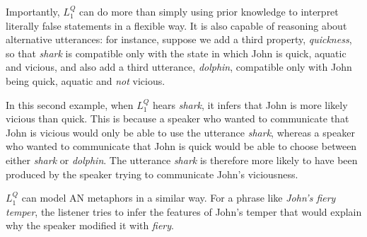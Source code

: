 \documentclass[9pt,twocolumn,twoside,lineno]{pnas-new}
\newcommand{\Listener}{L}
\newcommand{\QLONE}{\Listener_{{1}}^{{Q}}}
\begin{document}
	Importantly, $\QLONE$ can do more than simply using prior knowledge to interpret literally false statements in a flexible way. It is also capable of reasoning about alternative utterances: for instance, suppose we add a third property, \emph{quickness}, so that \emph{shark} is compatible only with the state in which John is quick, aquatic and vicious, and also add a third utterance, \emph{dolphin}, compatible only with John being quick, aquatic and \emph{not} vicious.

	
	In this second example, when $\QLONE$ hears \emph{shark}, it infers that John is more likely vicious than quick. This is because a speaker who wanted to communicate that John is vicious would only be able to use the utterance \emph{shark}, whereas a speaker who wanted to communicate that John is quick would be able to choose between either \emph{shark} or \emph{dolphin}. The utterance \emph{shark} is therefore more likely to have been produced by the speaker trying to communicate John's viciousness.

	



	$\QLONE$ can model AN metaphors in a similar way. For a phrase like \emph{John's fiery temper}, the listener tries to infer the features of John's temper that would explain why the speaker modified it with \emph{fiery}.

\end{document}
